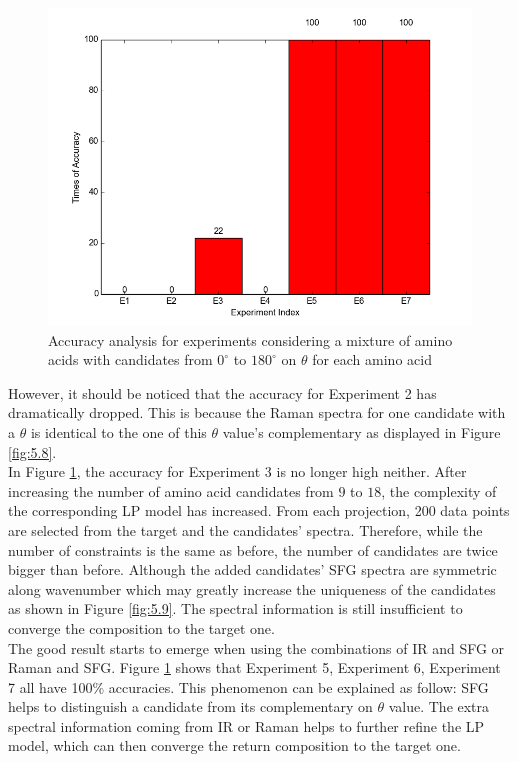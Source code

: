 \begin{figure}[!ht]
\centering
\includegraphics[scale=0.7]{Figures/accuracy_pecent_result10_mixture.png}
\caption{Accuracy analysis for experiments considering a mixture of amino acids with candidates from $0^{\circ}$ to $180^{\circ}$ on $\theta$ for each amino acid} \label{fig:5.3}
\end{figure}

However, it should be noticed that the accuracy for Experiment 2 has dramatically dropped. This is because the Raman spectra for one candidate with a $\theta$ is identical to the one of this $\theta$ value's complementary as displayed in Figure \ref{fig:5.8}. \\

In Figure \ref{fig:5.3}, the accuracy for Experiment 3 is no longer high neither. After increasing the number of amino acid candidates from $9$ to $18$, the complexity of the corresponding LP model has increased. From each projection, 200 data points are selected from the target and the candidates' spectra. Therefore, while the number of constraints is the same as before, the number of candidates are twice bigger than before. Although the added candidates' SFG spectra are symmetric along wavenumber which may greatly increase the uniqueness of the candidates as shown in Figure \ref{fig:5.9}. The spectral information is still insufficient to converge the composition to the target one. \\

The good result starts to emerge when using the combinations of IR and SFG or Raman and SFG. Figure \ref{fig:5.3} shows that Experiment 5, Experiment 6, Experiment 7 all have 100\% accuracies. This phenomenon can be explained as follow: SFG helps to distinguish a candidate from its complementary on $\theta$ value. The extra spectral information coming from IR or Raman helps to further refine the LP model, which can then converge the return composition to the target one. \\

